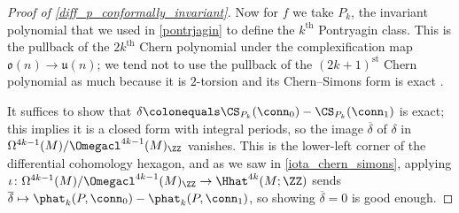 \begin{proof}[Proof of \cref{diff_p_conformally_invariant}]
Now for $f$ we take $P_k$, the invariant polynomial that we used in \cref{pontrjagin} to define the $k^{\mathrm{th}}$
Pontryagin class.  This is the pullback of the $2k^{\mathrm{th}}$ Chern polynomial under the complexification map
$\mathfrak o(n)\to\mathfrak u(n)$; we tend not to use the pullback of the $(2k+1)^{\mathrm{st}}$ Chern polynomial
as much because it is $2$-torsion and its Chern--Simons form is exact \cite[Proposition 4.3]{cs}.

It suffices to show that $\delta\colonequals \CS_{P_k}(\conn_0) - \CS_{P_k}(\conn_1)$ is exact; this implies
it is a closed form with integral periods, so the image $\overline\delta$ of $\delta$ in
$\Omega^{4k-1}(M)/\Omegacl^{4k-1}(M)_\ZZ$ vanishes. This is the lower-left corner of the differential cohomology
hexagon, and as we saw in \cref{iota_chern_simons}, applying
$\iota\colon\Omega^{4k-1}(M)/\Omegacl^{4k-1}(M)_\ZZ\to\Hhat^{4k}(M; \ZZ)$ sends $\overline\delta\mapsto\phat_k(P,
\conn_0) - \phat_k(P, \conn_1)$, so showing $\overline\delta = 0$ is good enough.


\end{proof}
